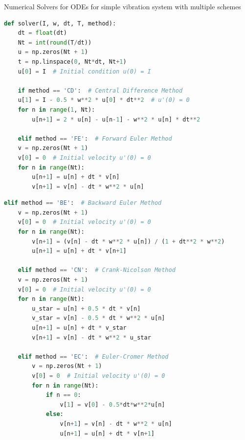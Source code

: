 \documentclass[10pt, aspectratio=54]{beamer}
\begin{document}
\begin{frame}[fragile]{Numerical Solvers for ODEs for simple vibration system with multiple schemes}
	\scriptsize %
	\begin{lstlisting}[language=Python]
def solver(I, w, dt, T, method):
	dt = float(dt)
	Nt = int(round(T/dt))
	u = np.zeros(Nt + 1)
	t = np.linspace(0, Nt*dt, Nt+1)
	u[0] = I  # Initial condition u(0) = I

	if method == 'CD':  # Central Difference Method
	u[1] = I - 0.5 * w**2 * u[0] * dt**2  # u'(0) = 0
	for n in range(1, Nt):
		u[n+1] = 2 * u[n] - u[n-1] - w**2 * u[n] * dt**2
	
	elif method == 'FE':  # Forward Euler Method
	v = np.zeros(Nt + 1)
	v[0] = 0  # Initial velocity u'(0) = 0
	for n in range(Nt):
		u[n+1] = u[n] + dt * v[n]
		v[n+1] = v[n] - dt * w**2 * u[n]

	\end{lstlisting}
\end{frame}

\begin{frame}[fragile]{}
	\scriptsize %
	\begin{lstlisting}[language=Python]
	elif method == 'BE':  # Backward Euler Method
	v = np.zeros(Nt + 1)
	v[0] = 0  # Initial velocity u'(0) = 0
	for n in range(Nt):
		v[n+1] = (v[n] - dt * w**2 * u[n]) / (1 + dt**2 * w**2)
		u[n+1] = u[n] + dt * v[n+1]
	
	elif method == 'CN':  # Crank-Nicolson Method
	v = np.zeros(Nt + 1)
	v[0] = 0  # Initial velocity u'(0) = 0
	for n in range(Nt):
		u_star = u[n] + 0.5 * dt * v[n]
		v_star = v[n] - 0.5 * dt * w**2 * u[n]
		u[n+1] = u[n] + dt * v_star
		v[n+1] = v[n] - dt * w**2 * u_star
		
	elif method == 'EC':  # Euler-Cromer Method
		v = np.zeros(Nt + 1)
		v[0] = 0  # Initial velocity u'(0) = 0
		for n in range(Nt):
			if n == 0:
				v[1] = v[0] - 0.5*dt*w**2*u[n]
			else:
				v[n+1] = v[n] - dt * w**2 * u[n]
				u[n+1] = u[n] + dt * v[n+1]

		
	\end{lstlisting}
\end{frame}
\end{document}

